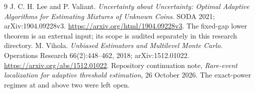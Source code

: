 \documentclass[11pt]{article}
\begin{document}
\begin{thebibliography}{9}
 J. C. H. Lee and P. Valiant.
\emph{Uncertainty about Uncertainty: Optimal Adaptive Algorithms for Estimating
Mixtures of Unknown Coins}. SODA 2021; arXiv:1904.09228v3.
\url{https://arxiv.org/html/1904.09228v3}.
The fixed-gap lower theorem is an external input; its scope is audited
separately in this research directory.
 M. Vihola. \emph{Unbiased Estimators and Multilevel Monte Carlo}.
Operations Research 66(2):448--462, 2018; arXiv:1512.01022.
\url{https://arxiv.org/abs/1512.01022}.
 Repository continuation note,
\emph{Rare-event localization for adaptive threshold estimation},
26 October 2026. The exact-power regimes at and above two were left open.
\end{thebibliography}
\end{document}
